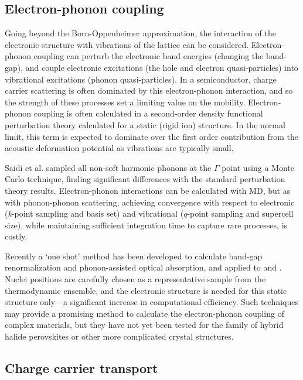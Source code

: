 \subsection{Electron-phonon coupling} \label{ch2epcoupling}

Going beyond the Born-Oppenheimer approximation, the interaction of the electronic structure with vibrations of the lattice can be considered. 
Electron-phonon coupling can perturb the electronic band energies (changing the band-gap), and couple electronic excitations (the hole and electron quasi-particles) into vibrational excitations (phonon quasi-particles). 
In a semiconductor, charge carrier scattering is often dominated by this electron-phonon interaction, and so the strength of these processes set a limiting value on the mobility. 
Electron-phonon coupling is often calculated in a second-order density functional perturbation theory calculated for a static (rigid ion) structure.
In the normal limit, this term is expected to dominate over the first order contribution from the acoustic deformation potential as vibrations are typically small. 

Saidi et al. sampled all non-soft harmonic phonons at the $\Gamma$ point using a Monte Carlo technique,\autocite{Saidi2016} finding significant differences with the standard perturbation theory results.
%
Electron-phonon interactions can be calculated with MD, but as with phonon-phonon scattering, 
achieving convergence with respect to electronic (\textit{k}-point sampling and basis set) 
and vibrational ($q$-point sampling and supercell size), while maintaining sufficient integration time to capture rare processes, is costly.

Recently a `one shot' method has been developed to calculate band-gap renormalization and phonon-assisted optical absorption, and applied to  and .\autocite{Zacharias2016} 
Nuclei positions are carefully chosen as a representative sample from the thermodynamic ensemble, and the electronic structure is needed for this static structure only---a significant increase in computational efficiency. 
Such techniques may provide a promising method to calculate the electron-phonon coupling of complex materials, but they have not yet been tested for the family of hybrid halide perovskites or other more complicated crystal structures.

\subsection{Charge carrier transport}

